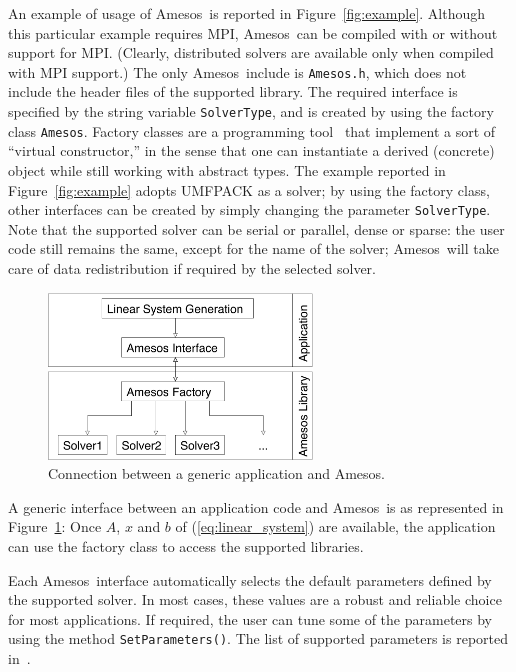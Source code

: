 \documentclass[acmtocl]{acmtrans2m}
\newcommand{\amesos}{{\sc Amesos}}
\begin{document}
An example of usage of \amesos\ is reported in Figure~\ref{fig:example}. 
Although this particular example requires MPI, \amesos\
can be compiled with or without support for MPI. (Clearly, distributed
solvers are available only when compiled with MPI support.) The only
\amesos\ include is \verb!Amesos.h!, which does not include the header files of
the supported library. The required interface is specified by the string
variable \verb!SolverType!, and is created by using the
factory class \verb!Amesos!. Factory classes are a programming
tool~\cite{alexandrescu01modern} that implement a sort of ``virtual
constructor,'' in the sense that one can instantiate a derived (concrete) object
while still working with abstract types. 
The example reported in Figure~\ref{fig:example} adopts UMFPACK as a solver; 
by using the factory class, other
interfaces can be created by simply changing the parameter
{\tt SolverType}. Note that the supported solver can be serial or parallel,
  dense or sparse: the user code still remains the same, except for the name
  of the solver;
  \amesos\ will take care of data redistribution if required by the selected
  solver. 

\begin{figure}
\begin{center}
\includegraphics[width=7cm]{amesos_and_application.pdf}
\end{center}
\caption{Connection between a generic application and \amesos.}
\label{fig:app}
\end{figure}

A generic interface between an application code and \amesos\ is as represented
in Figure~\ref{fig:app}: Once $A$, $x$ and $b$ of (\ref{eq:linear_system}) are
available, the application can use the factory class to access the supported
libraries.

Each \amesos\ interface automatically selects the default parameters defined by
the supported solver. In most cases, these values are a robust and reliable
choice for most applications. If required, the user can tune some of the
parameters by using the method \verb!SetParameters()!. The list of supported
parameters is reported in~\cite{Amesos-Reference-Guide}.
\end{document}
